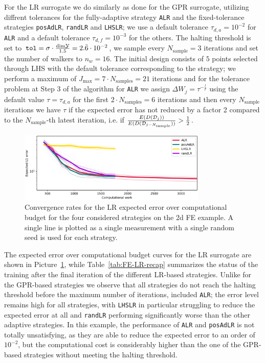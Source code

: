 For the LR surrogate we do similarly as done for the GPR surrogate, utilizing diffrent tolerances for the fully-adaptive strategy \texttt{ALR} and the fixed-tolerance strategies \texttt{posAdLR}, \texttt{randLR} and \texttt{LHSLR}; we use a default tolerance $\tau_{d,a}= 10^{-2}$ for \texttt{ALR} and a default tolerance $\tau_{d,f} = 10^{-3}$ for the others.
The halting threshold is set to $\texttt{tol} = \sigma \cdot \frac{\text{dim} \mathcal Y }{1.5} = 2.\bar 6 \cdot 10^{-2}$, we sample every $N_{\text{sample}} = 3$ iterations and set the number of walkers to $n_w = 16$.
The initial design consists of $5$ points selected through LHS with the default tolerance corresponding to the strategy; we perform a maximum of $J_{\max} = 7 \cdot N_{\text{samples}} = 21 $ iterations and for the tolerance problem at Step 3 of the algorithm for \texttt{ALR} we assign $\Delta W_j = \tau ^{-\frac{l}{r}}$ using the default value $\tau= \tau_{d,a}$ for the first $2\cdot N_{\text{samples}} = 6$ iterations and then every $N_{\text{sample}}$ iterations we have $\tau$ if the expected error has not reduced by a factor 2 compared to the $N_{\text{sample}}$-th latest iteration, i.e. if $\frac{E(D(\mathcal D_j))}{E(D(\mathcal D_{j-N_{\text{sample}}}))} > \frac{1}{2}$.\medskip

\begin{figure}[H]
    \begin{center}
        \includegraphics[width=0.8\textwidth]{results/pictures/d6/LR_res.png}
    \end{center}
    \caption{Convergence rates for the LR expected error over computational budget for the four considered strategies on the 2d FE example. A single line is plotted as a single measurement with a single random seed is used for each strategy.}
        \label{fig:FE-LR-convergence}
\end{figure}

The expected error over computational budget curves for the LR surrogate are shown in Picture~\ref{fig:FE-LR-convergence}, while Table~\ref{tab:FE-LR-recap} summarizes the status of the training after the final iteration of the different LR-based strategies. 
Unlike for the GPR-based strategies we observe that all strategies do not reach the halting threshold before the maximum number of iterations, included \texttt{ALR}; the error level remains high for all strategies, with \texttt{LHSLR} in particular struggling to reduce the expected error at all and \texttt{randLR} performing significantly worse than the other adaptive strategies.
In this example, the performance of \texttt{ALR} and \texttt{posAdLR} is not totally unsatisfying, as they are able to reduce the expected error to an order of $10^{-2}$, but the computational cost is considerably higher than the one of the GPR-based strategies without meeting the halting threshold.

